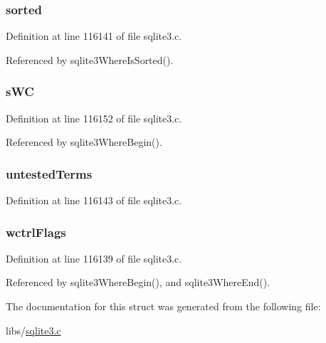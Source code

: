 \subsubsection[{sorted}]{ sorted}\label{struct_where_info_ad4c414c8a8cc2a3daa12a1d54f54bbbf}


Definition at line 116141 of file sqlite3.\+c.



Referenced by sqlite3\+Where\+Is\+Sorted().

\hypertarget{struct_where_info_a85a61ee9b696a7a1630f28ba2801f432}{}
\subsubsection[{s\+W\+C}]{ s\+W\+C}\label{struct_where_info_a85a61ee9b696a7a1630f28ba2801f432}


Definition at line 116152 of file sqlite3.\+c.



Referenced by sqlite3\+Where\+Begin().

\hypertarget{struct_where_info_a0a31d549c31640dcaeb02d9acb20d720}{}
\subsubsection[{untested\+Terms}]{ untested\+Terms}\label{struct_where_info_a0a31d549c31640dcaeb02d9acb20d720}


Definition at line 116143 of file sqlite3.\+c.

\hypertarget{struct_where_info_a199111eb285cee7d61eacce4ff5e5555}{}
\subsubsection[{wctrl\+Flags}]{ wctrl\+Flags}\label{struct_where_info_a199111eb285cee7d61eacce4ff5e5555}


Definition at line 116139 of file sqlite3.\+c.



Referenced by sqlite3\+Where\+Begin(), and sqlite3\+Where\+End().



The documentation for this struct was generated from the following file\+:\begin{DoxyCompactItemize}
\item 
libs/\hyperlink{sqlite3_8c}{sqlite3.\+c}\end{DoxyCompactItemize}
